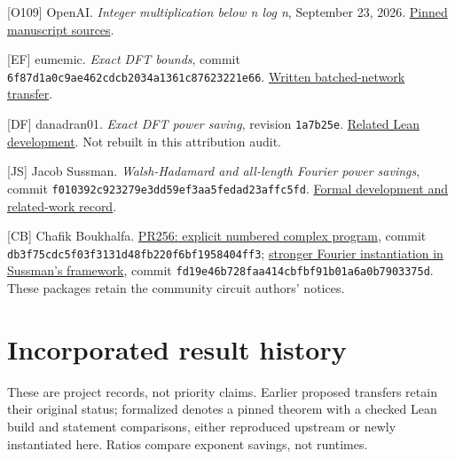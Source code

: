 \documentclass[
  11pt,
]{article}
\begin{document}
{[}O109{]} OpenAI. \emph{Integer multiplication below n log n},
September 23, 2026.
\href{https://github.com/openai/math/tree/adc7f1241b42e322a6451854ab7e4b4c146bf78a/preprints/Integer-multiplication-below-n-log-n-September-23-2026}{Pinned
manuscript sources}.

{[}EF{]} eumemic. \emph{Exact DFT bounds}, commit
\texttt{6f87d1a0c9\allowbreak{}ae462cdcb2\allowbreak{}034a1361c8\allowbreak{}7623221e66}.
\href{https://github.com/eumemic/exact-dft-bounds/tree/6f87d1a0c9ae462cdcb2034a1361c87623221e66}{Written
batched-network transfer}.

{[}DF{]} danadran01. \emph{Exact DFT power saving}, revision
\texttt{1a7b25e}.
\href{https://github.com/danadran01/exact-dft-power-saving/tree/1a7b25e}{Related
Lean development}. Not rebuilt in this attribution audit.

{[}JS{]} Jacob Sussman. \emph{Walsh-Hadamard and all-length Fourier
power savings}, commit
\texttt{f010392c92\allowbreak{}3279e3dd59\allowbreak{}ef3aa5feda\allowbreak{}d23affc5fd}.
\href{https://github.com/jacobalansussman/wht-power-saving-lean/tree/f010392c923279e3dd59ef3aa5fedad23affc5fd}{Formal
development and related-work record}.

{[}CB{]} Chafik Boukhalfa.
\href{https://github.com/CrocSwap/integer-mult-bounds/pull/256}{PR256:
explicit numbered complex program}, commit
\texttt{db3f75cdc5\allowbreak{}f03f3131d4\allowbreak{}8fb220f6bf\allowbreak{}1958404ff3};
\href{https://github.com/jacobalansussman/wht-power-saving-lean/pull/2}{stronger
Fourier instantiation in Sussman's framework}, commit
\texttt{fd19e46b72\allowbreak{}8faa414cbf\allowbreak{}bf91b01a6a\allowbreak{}0b7903375d}. These packages retain
the community circuit authors' notices.

\section{Incorporated result history}\label{incorporated-result-history}

These are project records, not priority claims. Earlier proposed
transfers retain their original status; formalized denotes a pinned
theorem with a checked Lean build and statement comparisons, either
reproduced upstream or newly instantiated here. Ratios compare exponent
savings, not runtimes.
\end{document}
